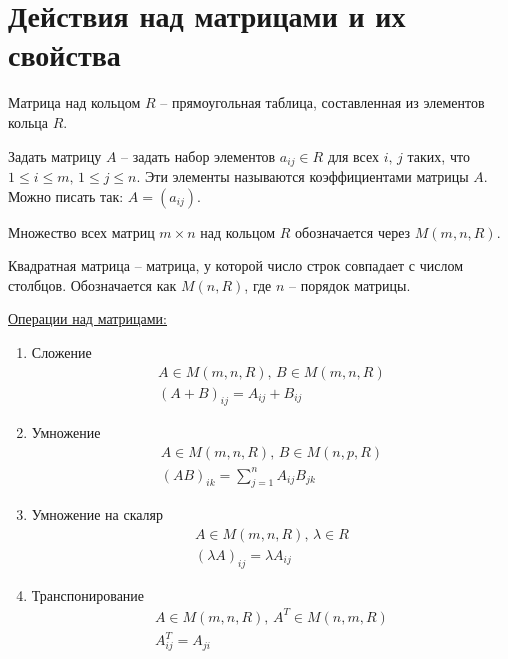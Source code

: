 \section{Действия над матрицами и их свойства}
\begin{conj}
    Матрица над кольцом $R$ -- прямоугольная таблица, составленная из элементов кольца $R$.
\end{conj}
Задать матрицу $A$ -- задать набор элементов $a_{ij} \in R$ для всех $i, \, j$ таких, что $1 \leq i \leq m, \, 1 \leq j \leq n$.
Эти элементы называются коэффициентами матрицы $A$. Можно писать так: $A = (a_{ij})$. 

Множество всех матриц $m \times n$ над кольцом $R$ обозначается через $M(m, n, R)$.
\begin{conj}
    Квадратная матрица -- матрица, у которой число строк совпадает с числом столбцов.
    Обозначается как $M(n, R)$, где $n$ -- порядок матрицы.
\end{conj}

\underline{Операции над матрицами:}
\begin{enumerate}
    \item Сложение
    \begin{gather*}
        A \in M(m, n, R), \, B \in M(m, n, R) \\
        (A + B)_{ij} = A_{ij} + B_{ij}
    \end{gather*}
    \item Умножение
    \begin{gather*}
        A \in M(m, n, R), \, B \in M(n, p, R) \\
        (AB)_{ik} = \sum_{j = 1}^n A_{ij} B_{jk} 
    \end{gather*}
    \item Умножение на скаляр
    \begin{gather*}
        A \in M(m, n, R), \, \lambda \in R \\
        (\lambda A)_{ij} = \lambda A_{ij}
    \end{gather*}
    \item Транспонирование
    \begin{gather*}
        A \in M(m, n, R), \, A^T \in M(n, m, R) \\
        A^T_{ij} = A_{ji}
    \end{gather*}
\end{enumerate}

